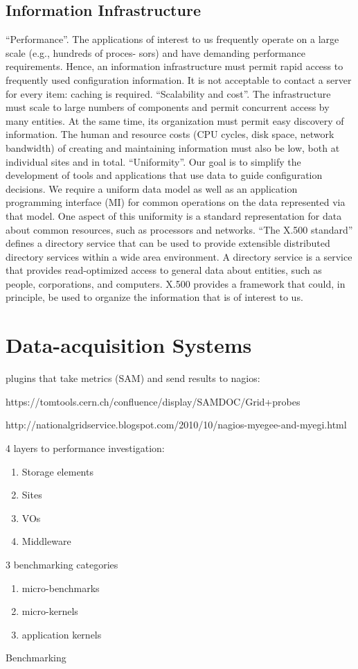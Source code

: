 \subsection{Information Infrastructure}
``Performance''.  The applications of interest to us frequently 
operate on  a  large scale  (e.g.,  hundreds  of  proces- 
sors) and have demanding performance requirements. 
Hence, an information infrastructure must permit rapid 
access to frequently used configuration information. It 
is not acceptable to contact  a  server  for every  item: 
caching is required.
``Scalability and cost''. The infrastructure must scale to large
numbers of components and permit concurrent access
by many entities. At the same time, its organization
must permit easy discovery of information. The human
and resource costs (CPU cycles, disk space, network
bandwidth) of creating and maintaining information
must also be low, both at individual sites and in total.
``Uniformity''. Our goal is to simplify the development of
tools and applications that use data to guide configuration
decisions. We require a uniform data model
as well as an application programming interface (MI)
for common operations on the data represented via that
model. One aspect of this uniformity is a standard representation
for data about common resources, such as
processors and networks.
``The X.500 standard'' defines a directory service
that can be used to provide extensible distributed directory
services within a wide area environment. A directory service
is a service that provides read-optimized access to general
data about entities, such as people, corporations, and computers.
X.500 provides a framework that could, in principle,
be used to organize the information that is of interest to us.
\cite{mds1}

\section{Data-acquisition Systems}
plugins that take metrics (SAM) and send results to nagios:

https://tomtools.cern.ch/confluence/display/SAMDOC/Grid+probes

http://nationalgridservice.blogspot.com/2010/10/nagios-myegee-and-myegi.html

4 layers to performance investigation:
\begin{enumerate}
  \item Storage elements
  \item Sites
  \item VOs
  \item Middleware
\end{enumerate}
3 benchmarking categories
\begin{enumerate}
  \item micro-benchmarks
  \item micro-kernels
  \item application kernels
\end{enumerate}
Benchmarking

